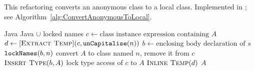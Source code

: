 \subsection{}
This refactoring converts an anonymous class to a local class. Implemented in ; see Algorithm~\ref{alg:ConvertAnonymousToLocal}.

\begin{algorithm}
\caption{$\refactoring{Convert Anonymous to Local}(A : \type{AnonymousClass}, n : \type{Name}) : \type{LocalClass}$}\label{alg:ConvertAnonymousToLocal}
\begin{algorithmic}[1]
\REQUIRE Java
\ENSURE Java $\cup$ locked names
\medskip
\STATE $c \leftarrow \text{class instance expression containing $A$}$
\STATE $d \leftarrow [\textsc{Extract Temp}](c, \text{\texttt{unCapitalise}}(n))$
\STATE $b \leftarrow \text{enclosing body declaration of $s$}$
\STATE $\text{\texttt{lockNames}}(b, n)$
\STATE convert $A$ to class named $n$, remove it from $c$
\STATE $\textsc{Insert Type}(b, A)$
\STATE lock type access of $c$ to $A$
\STATE $\textsc{Inline Temp}(d)$
\RETURN $A$
\end{algorithmic}
\end{algorithm}
